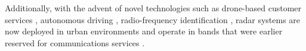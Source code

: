 \documentclass[10pt,journal]{IEEEtran}
\theoremstyle{definition}
\begin{document}
	Additionally, with the advent of novel technologies such as drone-based customer services \cite{alaee2019radar}, autonomous driving \cite{mishra2019remcw}, radio-frequency identification \cite{sedighi2019localization,sedighi2020localization}, radar systems are now deployed in urban environments and operate in bands that were earlier reserved for communications services \cite{elbir2019joint}. %
	\fi
	
\end{document}
